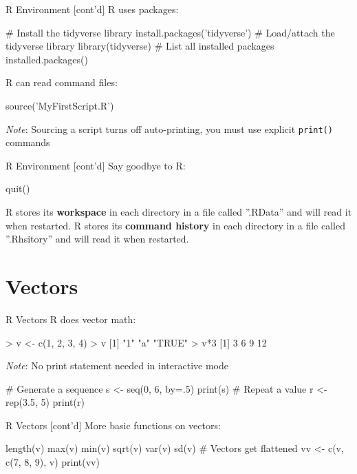 \documentclass[ignorenonframetext,xcolor=x11names]{beamer}
\begin{document}
\begin{frame}[fragile]{R Environment \small [cont'd]}
R uses packages:
\begin{Rcode}
# Install the tidyverse library
install.packages('tidyverse')
# Load/attach the tidyverse library
library(tidyverse)
# List all installed packages
installed.packages()
\end{Rcode}
R can read command files:
\begin{Rcode}
source('MyFirstScript.R')
\end{Rcode}
\emph{Note}: Sourcing a script turns off auto-printing, you must use explicit \texttt{print()} commands
\end{frame}

\begin{frame}[fragile]{R Environment \small [cont'd]}
Say goodbye to R:
\begin{Rcode}
quit()
\end{Rcode}
R stores its \textbf{workspace} in each directory in a file called ''.RData'' and will read it when restarted. R stores its \textbf{command history} in each directory in a file called ''.Rhsitory'' and will read it when restarted.
\end{frame}

\section{Vectors}

\begin{frame}[fragile]{R Vectors}
R does vector math:
\begin{Rcode}
> v <- c(1, 2, 3, 4)
> v
[1] "1"    "a"    "TRUE"
> v*3
[1]  3  6  9 12
\end{Rcode}
\emph{Note}: No print statement needed in interactive mode\\

\begin{Rcode}
# Generate a sequence
s <- seq(0, 6, by=.5)
print(s)
# Repeat a value
r <- rep(3.5, 5)
print(r)
\end{Rcode}
\end{frame}

\begin{frame}[fragile]{R Vectors \small [cont'd]}
More basic functions on vectors:
\begin{Rcode}
length(v)
max(v)
min(v)
sqrt(v)
var(v)
sd(v)
# Vectors get flattened
vv <- c(v, c(7, 8, 9), v)
print(vv)
\end{Rcode}
\end{frame}
\end{document}

